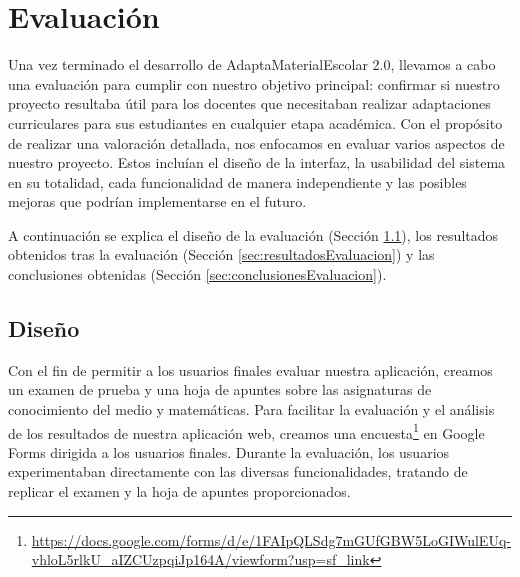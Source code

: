 \chapter{Evaluación}
\label{cap:evaluacion}
Una vez terminado el desarrollo de AdaptaMaterialEscolar 2.0, llevamos a cabo una evaluación para cumplir con nuestro objetivo principal: confirmar si nuestro proyecto resultaba útil para los docentes que necesitaban realizar adaptaciones curriculares para sus estudiantes en cualquier etapa académica. Con el propósito de realizar una valoración detallada, nos enfocamos en evaluar varios aspectos de nuestro proyecto. Estos incluían el diseño de la interfaz, la usabilidad del sistema en su totalidad, cada funcionalidad de manera independiente y las posibles mejoras que podrían implementarse en el futuro.

A continuación se explica el diseño de la evaluación (Sección \ref{sec:disenyoEvaluacion}), los resultados obtenidos tras la evaluación (Sección \ref{sec:resultadosEvaluacion}) y las conclusiones obtenidas (Sección \ref{sec:conclusionesEvaluacion}).

\section{Diseño}\label{sec:disenyoEvaluacion}
Con el fin de permitir a los usuarios finales evaluar nuestra aplicación, creamos un examen de prueba y una hoja de apuntes sobre las asignaturas de conocimiento del medio y matemáticas.
Para facilitar la evaluación y el análisis de los resultados de nuestra aplicación web, creamos una encuesta\footnote{\url{https://docs.google.com/forms/d/e/1FAIpQLSdg7mGUfGBW5LoGIWulEUq-vhloL5rlkU_aIZCUzpqiJp164A/viewform?usp=sf_link}} en Google Forms dirigida a los usuarios finales. Durante la evaluación, los usuarios experimentaban directamente con las diversas funcionalidades, tratando de replicar el examen y la hoja de apuntes proporcionados.

